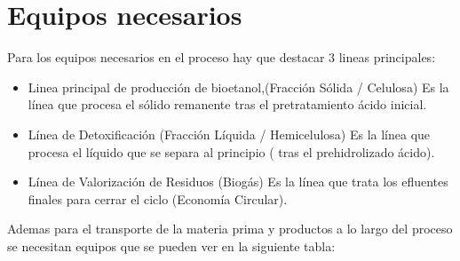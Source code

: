 \documentclass{report}
\begin{document}
\section{Equipos necesarios}
Para los equipos necesarios en el proceso hay que destacar 3 lineas principales:
\begin{itemize}
    \item Linea principal de producción de bioetanol,(Fracción Sólida / Celulosa) Es la línea que procesa el sólido remanente tras el pretratamiento ácido inicial.
    \item Línea de Detoxificación (Fracción Líquida / Hemicelulosa) Es la línea que procesa el líquido que se separa al principio ( tras el prehidrolizado ácido).
    \item Línea de Valorización de Residuos (Biogás) Es la línea que trata los efluentes finales para cerrar el ciclo (Economía Circular).
\end{itemize}
Ademas para el transporte de la materia prima y productos a lo largo del proceso se necesitan equipos que se pueden ver en la siguiente tabla:
\end{document}
